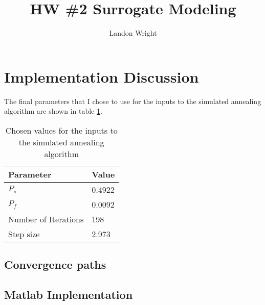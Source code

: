 \documentclass{article}
\begin{document}
\singlespacing
\title{HW \#2 Surrogate Modeling}
\author{Landon Wright}
\maketitle
\section{Implementation Discussion}
The final parameters that I chose to use for the inputs to the simulated annealing algorithm are shown in table \ref{tab:values}.  
\begin{table}
	\begin{center}
		\caption{Chosen values for the inputs to the simulated annealing algorithm}
		\label{tab:values}
\begin{tabular}{ll}
	Parameter & Value\\
	\hline
	$P_s$ & 0.4922 \\ 
	$P_f$ & 0.0092 \\ 
	Number of Iterations & 198 \\ 
	Step size & 2.973 \\ 
\end{tabular}
\end{center}
\end{table} 






\subsection{Convergence paths}

\subsection{Matlab Implementation}
\inputminted[xleftmargin=10pt, linenos]{matlab}{simAnnealObj.m}
\end{document}
